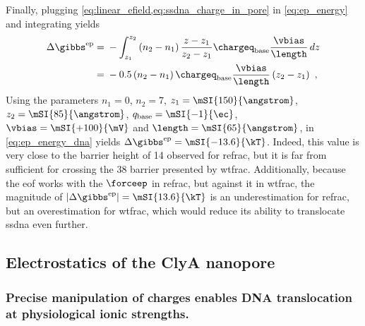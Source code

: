 Finally, plugging \cref{eq:linear_efield,eq:ssdna_charge_in_pore} in \cref{eq:ep_energy} and integrating
yields
%
\begin{align}\label{eq:ep_energy_dna}
  \Delta \gibbs^{\textrm{ep}} %
     ={}& - \int_{z_1}^{z_2} %
          \left(  n_2 - n_1 \right) %
          \dfrac{ z - z_1 }{z_2 - z_1}
          \chargeq_{\textrm{base}} \dfrac{\vbias}{\length} \,dz \nonumber \\
     ={}& - 0.5 \left(  n_2 - n_1 \right)  \chargeq_{\textrm{base}}
            \dfrac{\vbias}{\length} \left(  z_2 - z_1 \right)
  \text{ ,}
\end{align}
%
Using the parameters $n_1 = 0$, $n_2 = 7$, $z_1 = \mSI{150}{\angstrom}$, $z_2 = \mSI{85}{\angstrom}$,
$q_{\textrm{base}} = \mSI{-1}{\ec}$, $\vbias = \mSI{+100}{\mV}$ and $\length = \mSI{65}{\angstrom}$, in
\cref{eq:ep_energy_dna} yields $\Delta \gibbs^{\textrm{ep}} = \mSI{-13.6}{\kT}$. Indeed, this value is very
close to the barrier height of \SI{14}{\kT} observed for \gls{refrac}, but it is far from sufficient for
crossing the \SI{38}{\kT} barrier presented by \gls{wtfrac}. Additionally, because the \gls{eof} works with
the $\forceep$ in \gls{refrac}, but against it in \gls{wtfrac}, the magnitude of $ \left| \Delta
\gibbs^{\textrm{ep}} \right| = \mSI{13.6}{\kT}$ is an underestimation for \gls{refrac}, but an overestimation
for \gls{wtfrac}, which would reduce its ability to translocate \gls{ssdna} even further.


%
%
\subsection{Electrostatics of the ClyA nanopore}
%
\label{sec:elec:clya}
%

\subsubsection{Precise manipulation of charges enables {DNA} translocation at physiological ionic strengths.}
%

